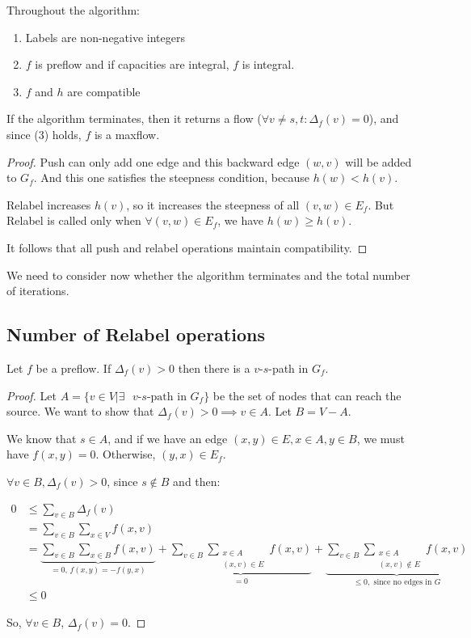 \begin{mylemma}
Throughout the algorithm:
\begin{enumerate}
\item Labels are non-negative integers
\item $f$ is preflow and if capacities are integral, $f$ is integral.
\item $f$ and $h$ are compatible
\end{enumerate}

If the algorithm terminates, then it returns a flow ($\forall v \neq s,t: \Delta_f(v) = 0$), and since (3) holds, $f$ is a maxflow.
\end{mylemma}
\begin{proof}
Push can only add one edge and this backward edge $(w,v)$ will be added to $G_f$. And this one satisfies the steepness condition, because $h(w) < h(v)$.

Relabel increases $h(v)$, so it increases the steepness of all $(v,w) \in E_f$. But Relabel is called only when $\forall (v,w) \in E_f$, we have $h(w) \ge h(v)$.

It follows that all push and relabel operations maintain compatibility.
\end{proof}

We need to consider now whether the algorithm terminates and the total number of iterations.

\subsection{Number of Relabel operations}

\begin{mylemma}
Let $f$ be a preflow. If $\Delta_f(v) > 0$ then there is a $v$-$s$-path in $G_f$.
\end{mylemma}
\begin{proof}
Let $A = \{v \in V | \exists \text{ $v$-$s$-path in $G_f$}\}$ be the set of nodes that can reach the source. We want to show that $\Delta_f(v) > 0 \implies v \in A$. Let $B = V - A$.

We know that $s\in A$, and if we have an edge $(x,y) \in E, x \in A, y \in B$, we must have $f(x,y) = 0$. Otherwise, $(y,x) \in E_f$.

$\forall v \in B, \Delta_f(v) > 0$, since $s \notin B$ and then:

\begin{align*}
0 &\le \sum\limits_{v \in B} \Delta_f(v) \\
&= \sum\limits_{v \in B} \sum\limits_{x \in V} f(x,v) \\
&=  \underbrace{\sum\limits_{v \in B} \sum\limits_{x \in B} f(x,v)}_{=0 \text{, $f(x,y) = -f(y,x)$}} + \underbrace{\sum\limits_{v \in B} \sum\limits_{\substack{x \in A\\(x,v) \in E}} f(x,v)}_{=0} + \underbrace{\sum\limits_{v \in B} \sum\limits_{\substack{x \in A\\(x,v) \notin E}} f(x,v)}_{\le 0, \text{ since no edges in $G$}} \\
&\le 0
\end{align*}

So, $\forall v \in B$, $\Delta_f(v) = 0$.
\end{proof}

